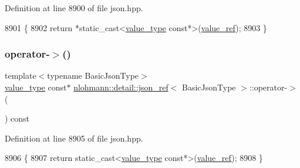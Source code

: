 Definition at line 8900 of file json.\+hpp.


\begin{DoxyCode}
8901     \{
8902         \textcolor{keywordflow}{return} *\textcolor{keyword}{static\_cast<}\hyperlink{classnlohmann_1_1detail_1_1json__ref_a78d76cf288141049568c0d670ed670ef}{value\_type} const*\textcolor{keyword}{>}(\hyperlink{classnlohmann_1_1detail_1_1json__ref_a23504615c2076070d5e087443bb376a4}{value\_ref});
8903     \}
\end{DoxyCode}
\mbox{\label{classnlohmann_1_1detail_1_1json__ref_adb652774a67829876449dc0b30637456}} 
\subsubsection{\texorpdfstring{operator-\/$>$()}{operator->()}}
{\footnotesize\ttfamily template$<$typename Basic\+Json\+Type$>$ \\
\hyperlink{classnlohmann_1_1detail_1_1json__ref_a78d76cf288141049568c0d670ed670ef}{value\+\_\+type} const$\ast$ \hyperlink{classnlohmann_1_1detail_1_1json__ref}{nlohmann\+::detail\+::json\+\_\+ref}$<$ Basic\+Json\+Type $>$\+::operator-\/$>$ (\begin{DoxyParamCaption}{ }\end{DoxyParamCaption}) const\hspace{0.3cm}{\ttfamily [inline]}}



Definition at line 8905 of file json.\+hpp.


\begin{DoxyCode}
8906     \{
8907         \textcolor{keywordflow}{return} \textcolor{keyword}{static\_cast<}\hyperlink{classnlohmann_1_1detail_1_1json__ref_a78d76cf288141049568c0d670ed670ef}{value\_type} const*\textcolor{keyword}{>}(\hyperlink{classnlohmann_1_1detail_1_1json__ref_a23504615c2076070d5e087443bb376a4}{value\_ref});
8908     \}
\end{DoxyCode}
\mbox{\label{classnlohmann_1_1detail_1_1json__ref_a98956ba676b1ae16b62346f9c4fb752e}} 
